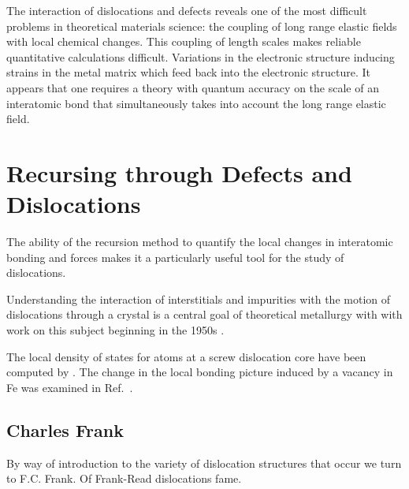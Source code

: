 

The interaction of dislocations and defects reveals one of the most difficult problems
in theoretical materials science: the coupling of long range elastic fields
with local chemical changes. This coupling of length scales makes
reliable quantitative calculations difficult. Variations in the electronic structure
inducing strains in the metal matrix which feed back into the electronic structure. 
It appears that one requires a theory with quantum accuracy on the scale of an 
interatomic bond that simultaneously takes into account the long range elastic 
field.


\section{Recursing through Defects and Dislocations}
The ability of the recursion method to quantify the local changes in interatomic bonding and
forces makes it a particularly useful tool for the study of dislocations. 

Understanding the interaction of interstitials and impurities with the motion of
dislocations through a crystal is a central goal of theoretical metallurgy with
with work on this subject beginning in the 1950s \cite{cochardt55}.

The local density of states for atoms at a screw dislocation core have been computed by \cite{paidar81,masuda81}. 
The change in the local bonding picture induced by a vacancy in Fe was examined in Ref.~\cite{masuda82,ohta87}.

\subsection{Charles Frank}
By way of introduction to the variety of dislocation structures that occur
we turn to F.C. Frank. Of Frank-Read dislocations fame.

